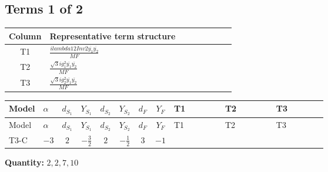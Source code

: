 \documentclass[8pt]{article}
\begin{document}
\begin{landscape}
\subsection*{Terms 1 of 2}
\begin{center}
\begin{tabular}{@{}c >{\raggedright\arraybackslash}p{0.82\linewidth}@{}}
\toprule
Column & Representative term structure \\
\midrule
T1 & \(\displaystyle \frac{i lambda12Inv2 \overline{y_{1}} \overline{y_{2}}}{MF}\) \\
\midrule
T2 & \(\displaystyle \frac{\sqrt{3} i g_{1}^{2} \overline{y_{1}} \overline{y_{2}}}{MF}\) \\
\midrule
T3 & \(\displaystyle \frac{\sqrt{3} i g_{2}^{2} \overline{y_{1}} \overline{y_{2}}}{MF}\) \\
\midrule
\bottomrule
\end{tabular}
\end{center}
\smallskip
\tiny
\begin{longtable}{@{}llcccccc >{\raggedright\arraybackslash}p{0.21\linewidth} >{\raggedright\arraybackslash}p{0.21\linewidth} >{\raggedright\arraybackslash}p{0.21\linewidth}@{}}
\toprule
Model & $\alpha$ & $d_{S_1}$ & $Y_{S_1}$ & $d_{S_2}$ & $Y_{S_2}$ & $d_F$ & $Y_F$ & T1 & T2 & T3 \\
\midrule
\endfirsthead
\toprule
Model & $\alpha$ & $d_{S_1}$ & $Y_{S_1}$ & $d_{S_2}$ & $Y_{S_2}$ & $d_F$ & $Y_F$ & T1 & T2 & T3 \\
\midrule
\endhead
T3-C & $-3$ & $2$ & $-\frac{3}{2}$ & $2$ & $-\frac{1}{2}$ & $3$ & $-1$ & \scriptsize\adjustbox{max width=\linewidth}{$\begin{gathered} - \frac{i lambda12Inv2 \overline{y_{1}} \overline{y_{2}}}{3 MF}\end{gathered}$} & \scriptsize\adjustbox{max width=\linewidth}{$\begin{gathered} - \frac{\sqrt{3} i g_{1}^{2} \overline{y_{1}} \overline{y_{2}}}{2 MF}\end{gathered}$} & \scriptsize\adjustbox{max width=\linewidth}{$\begin{gathered} - \frac{\sqrt{3} i g_{2}^{2} \overline{y_{1}} \overline{y_{2}}}{4 MF}\end{gathered}$} \\
\midrule
\bottomrule
\end{longtable}
\clearpage
\noindent\textbf{Quantity: }$\mathrm{2,2,7,10}$\par\smallskip

\end{landscape}
\end{document}

